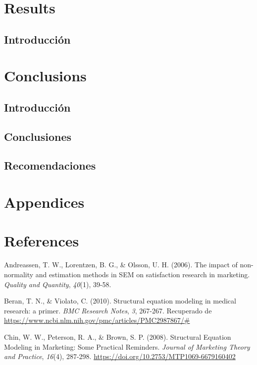 \documentclass[
  english]{revcoles}
\begin{document}
\section{Results}

\subsection{Introducción}

\section{Conclusions}

\subsection{Introducción}

\subsection{Conclusiones}

\subsection{Recomendaciones}

\section{Appendices}

\section*{References}

\hypertarget{refs}{}
\leavevmode\hypertarget{ref-andreassen}{}%
Andreassen, T. W., Lorentzen, B. G., \& Olsson, U. H. (2006). The impact
of non-normality and estimation methods in SEM on satisfaction research
in marketing. \emph{Quality and Quantity}, \emph{40}(1), 39-58.

\leavevmode\hypertarget{ref-Beran2010StructuralEM}{}%
Beran, T. N., \& Violato, C. (2010). Structural equation modeling in
medical research: a primer. \emph{BMC Research Notes}, \emph{3},
267-267. Recuperado de
\url{https://www.ncbi.nlm.nih.gov/pmc/articles/PMC2987867/\#}

\leavevmode\hypertarget{ref-chin}{}%
Chin, W. W., Peterson, R. A., \& Brown, S. P. (2008). Structural
Equation Modeling in Marketing: Some Practical Reminders. \emph{Journal
of Marketing Theory and Practice}, \emph{16}(4), 287-298.
\url{https://doi.org/10.2753/MTP1069-6679160402}
\end{document}
